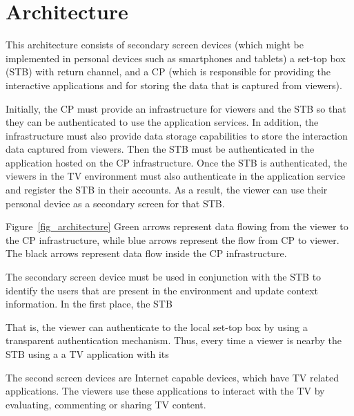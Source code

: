 \documentclass[conference,a4paper]{IEEEtran}
\begin{document}
\section{Architecture}

This architecture consists of secondary screen devices (which might be implemented in personal devices such as smartphones and tablets) a set-top box (STB) with return channel, and a CP (which is responsible for providing the interactive applications and for storing the data that is captured from viewers).

Initially, the CP must provide an infrastructure for viewers and the STB so that they can be authenticated to use the application services. In addition, the infrastructure must also provide data storage capabilities to store the interaction data captured from viewers. Then the STB must be authenticated in the application hosted on the CP infrastructure. Once the STB is authenticated, the viewers in the TV environment must also authenticate in the application service and register the STB in their accounts. As a result, the viewer can use their personal device as a secondary screen for that STB.

Figure~\ref{fig_architecture} Green arrows represent data flowing from the viewer to the CP infrastructure, while blue arrows represent the flow from CP to viewer. The black arrows represent data flow inside the CP infrastructure.

The secondary screen device must be used in conjunction with the STB to identify the users that are present in the environment and update context information. In the first place, the STB 

That is, the viewer can authenticate to the local set-top box by using a transparent authentication mechanism. Thus, every time a viewer is nearby the STB using a a TV application with its 

The second screen devices are Internet capable devices, which have TV related applications. The viewers use these applications to interact with the TV by evaluating, commenting or sharing TV content.
\end{document}
